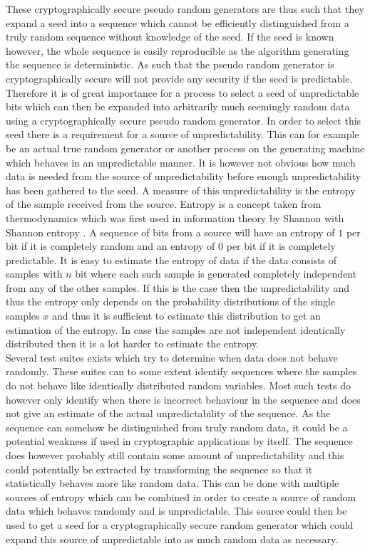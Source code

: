 \documentclass[a4paper,11pt]{report}
\begin{document}
\noindent
These cryptographically secure pseudo random generators are thus such that 
they expand a seed into a sequence which cannot be efficiently distinguished 
from a truly random sequence without knowledge of the seed. If the seed is 
known however, the whole sequence is easily reproducible as the algorithm 
generating the sequence is deterministic. As such that the pseudo random
generator is cryptographically secure will not provide any security if the seed
is predictable. Therefore it is of great importance for a process to select a 
seed of unpredictable bits which can then be expanded into arbitrarily much 
seemingly random data using a cryptographically secure pseudo random generator.
In order to select
this seed there is a requirement for a source of unpredictability. This can
for example be an actual true random generator or another process on the 
generating machine which behaves in an unpredictable manner. It is however not
obvious how much data is needed from the source of unpredictability before 
enough unpredictability has been gathered to the seed. A measure of this 
unpredictability is the entropy of the sample received from the source.
Entropy is a concept taken from thermodynamics which was first used in 
information theory by Shannon with Shannon entropy
\cite{Shannon:2001:MTC:584091.584093}.
A sequence of bits from a source will have an entropy of $1$ per bit if
it is completely random and an entropy of $0$ per bit if it is 
completely predictable. It is easy to estimate the entropy of 
data if the data consists of samples with $n$ bit where each such sample is
generated completely independent from any of the other samples. If this is the 
case then the unpredictability and thus the entropy only depends on the 
probability distributions of the single samples $x$ and thus it is sufficient
to estimate this distribution to get an estimation of the entropy.
In case the samples are not independent identically distributed then it 
is a lot harder to estimate the entropy. \\

\noindent
Several test suites exists which try to determine when data does not behave 
randomly\cite{Ecuyer2007}\cite{Bassham:2010:SRS:2206233}. These suites can to some extent 
identify sequences where the samples do not behave like identically distributed
random variables. Most such tests do however only identify when there is 
incorrect behaviour in the sequence and does not give an estimate of the actual
unpredictability of the sequence. As the sequence can somehow be distinguished 
from truly random data, it could be a potential weakness if used in 
cryptographic applications by itself. The sequence does however probably still
contain some amount of unpredictability and this could potentially be extracted
by transforming the sequence so that it statistically behaves more like random
data. This can be done with multiple sources of entropy which can be combined 
in order to create a source of random data which behaves randomly and is 
unpredictable. This source could then be used to get a seed for a
cryptographically secure random generator which could expand this source of 
unpredictable into as much random data as necessary.\\
\end{document}
